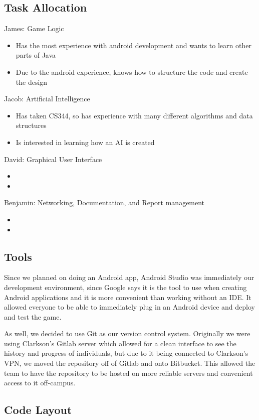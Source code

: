 \documentclass{article}
\begin{document}
\subsection{Task Allocation}
James: Game Logic
\begin{itemize}
  \item Has the most experience with android development and wants to learn other parts of Java
  \item Due to the android experience, knows how to structure the code and create the design
\end{itemize}
Jacob: Artificial Intelligence
\begin{itemize}
  \item Has taken CS344, so has experience with many different algorithms and data structures
  \item Is interested in learning how an AI is created
\end{itemize}
David: Graphical User Interface
\begin{itemize}
  \item 
  \item 
\end{itemize}
Benjamin: Networking, Documentation, and Report management
\begin{itemize}
  \item 
  \item 
\end{itemize}

\subsection{Tools}
	Since we planned on doing an Android app, Android Studio was immediately our development environment, since Google says it is the tool to use when creating Android applications and it is more convenient than working without an IDE. It allowed everyone to be able to immediately plug in an Android device and deploy and test the game.\par 
	As well, we decided to use Git as our version control system. Originally we were using Clarkson's Gitlab server which allowed for a clean interface to see the history and progress of individuals, but due to it being connected to Clarkson's VPN, we moved the repository off of Gitlab and onto Bitbucket. This allowed the team to have the repository to be hosted on more reliable servers and convenient access to it off-campus.

\subsection{Code Layout}
\end{document}
